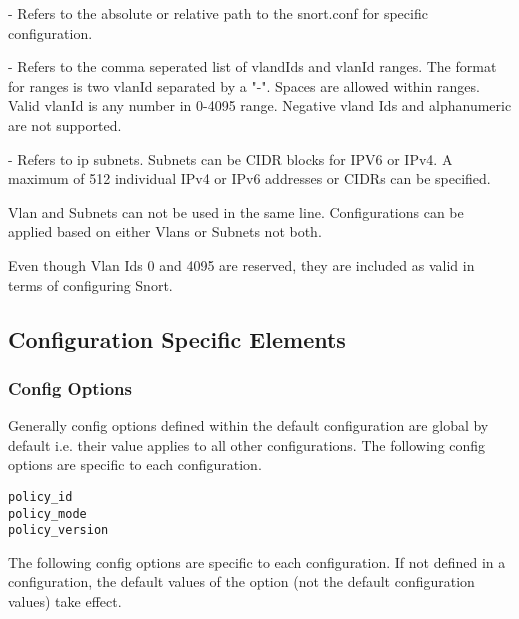 \documentclass[english]{report}
\newenvironment{note}{
\samepage
    \vspace{10pt}{\textsf{
        {\hspace{7pt}\Huge{$\triangle$\hspace{-12.5pt}{\Large{$^!$}}}}\hspace{5pt}
        {\Large{NOTE}}
    }
    }
   \begin{center}
    \par\vspace{-17pt}

    \begin{lrbox}{\savepar}
    \begin{minipage}[r]{6in}
}
{
    \end{minipage}
    \end{lrbox}
    \fbox{
        \usebox{
            \savepar
	}
    }
    \par\vskip10pt
    \end{center}
}
\newenvironment{note}{
        \begin{rawhtml}
        <p><table border="1"><tr><td><b>
        Note:&nbsp;&nbsp;</b>
        \end{rawhtml}
}{
        \begin{rawhtml}
        </b></td></tr></table></p>
        \end{rawhtml}
}
\begin{document}
\begin{description}{}

\item [\texttt{path\_to\_snort.conf}] - Refers to the absolute or relative path to 
the snort.conf for specific configuration.

\item [\texttt{vlanIdList}] - Refers to the comma seperated list of vlandIds and 
vlanId ranges. The format for ranges is two vlanId separated by a "-". Spaces are 
allowed within ranges. Valid vlanId is any number in 0-4095 range. Negative vland 
Ids and alphanumeric are not supported.

\item [\texttt{ipList}] - Refers to ip subnets. Subnets can be CIDR blocks for 
IPV6 or IPv4.  A maximum of 512 individual IPv4 or IPv6 addresses or CIDRs can be
specified.

\end{description}

\begin{note}
Vlan and Subnets can not be used in the same line. Configurations can be applied 
based on either Vlans or Subnets not both.
\end{note}

\begin{note}
Even though Vlan Ids 0 and 4095 are reserved, they are included as valid in terms
of configuring Snort.
\end{note}

\subsection{Configuration Specific Elements}

\subsubsection{Config Options}
Generally config options defined within the default configuration are global by 
default i.e. their value applies to all other configurations. The following config 
options are specific to each configuration.

\begin{verbatim}
policy_id
policy_mode
policy_version
\end{verbatim}

The following config options are specific to each configuration. If not defined in 
a configuration, the default values of the option (not the default configuration 
values) take effect.
\end{document}
